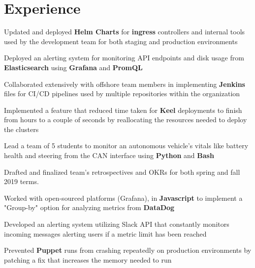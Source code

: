 \documentclass[]{deedy-resume-openfont}
\begin{document}
\begin{minipage}[t]{0.66\textwidth} 


\section{Experience}
\vspace{\topsep} %
\begin{tightemize} 
\item Updated and deployed \textbf{Helm Charts} for \textbf{ingress} controllers and internal tools used by the development team for both staging and production environments
\item Deployed an alerting system for monitoring API endpoints and disk usage  from \textbf{Elasticsearch} using \textbf{Grafana} and \textbf{PromQL} 
\item Collaborated extensively with offshore team members in implementing \textbf{Jenkins} files for CI/CD pipelines used by multiple repositories within the organization 
\item Implemented a feature that reduced time taken for \textbf{Keel} deployments to finish from hours to a couple of seconds by reallocating the resources needed to deploy the clusters
\end{tightemize}
\sectionsep

\begin{tightemize}
\item Lead a team of 5 students to monitor an autonomous vehicle's vitals like battery health and steering from the CAN interface using \textbf{Python} and \textbf{Bash}
\item Drafted and finalized team's retrospectives and OKRs for both spring and fall 2019 terms.
\end{tightemize}
\sectionsep
{}
\begin{tightemize} 
\item Worked with open-sourced platforms (Grafana), in \textbf{Javascript} to implement a "Group-by" option for analyzing metrics from \textbf {DataDog}
\item Developed an alerting system utilizing Slack API that constantly monitors incoming messages alerting users if a metric limit has been reached
\item  Prevented \textbf{Puppet} runs from crashing repeatedly on production environments by patching a fix that increases the memory needed to run
\end{tightemize}
\sectionsep




\end{minipage}
\end{document}
